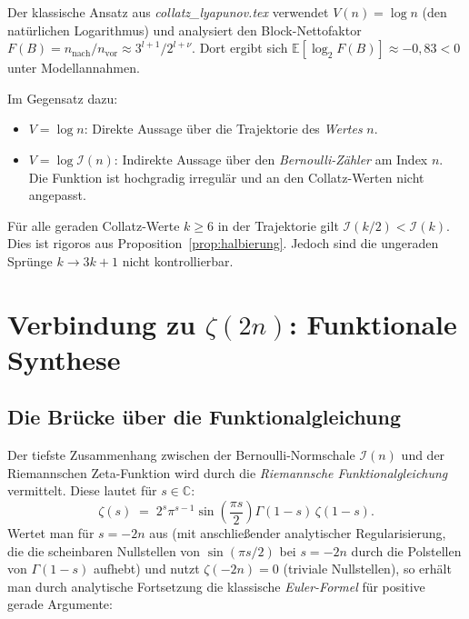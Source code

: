\documentclass[12pt,a4paper]{article}
\newcommand{\C}{\mathbb{C}}
\newcommand{\E}{\mathbb{E}}
\newcommand{\logt}{\log_2}
\newcommand{\In}{\mathcal{I}}      %
\begin{document}
Der klassische Ansatz aus \textit{collatz\_lyapunov.tex} verwendet
$V(n) = \log n$ (den natürlichen Logarithmus) und analysiert den Block-Nettofaktor
$F(B) = n_{\text{nach}} / n_{\text{vor}} \approx 3^{l+1}/2^{l+\nu}$. Dort ergibt sich
$\E[\logt F(B)] \approx -0{,}83 < 0$ unter Modellannahmen.

Im Gegensatz dazu:
\begin{itemize}[noitemsep]
  \item $V = \log n$: Direkte Aussage über die Trajektorie des \emph{Wertes} $n$.
  \item $V = \log\In(n)$: Indirekte Aussage über den \emph{Bernoulli-Zähler} am Index $n$.
    Die Funktion ist hochgradig irregulär und an den Collatz-Werten nicht angepasst.
\end{itemize}

\begin{tcolorbox}[ergebnis, title={Bewiesenes Ergebnis: Gerade Schritte}]
Für alle geraden Collatz-Werte $k \geq 6$ in der Trajektorie gilt
$\In(k/2) < \In(k)$. Dies ist rigoros aus Proposition~\ref{prop:halbierung}.
Jedoch sind die ungeraden Sprünge $k \to 3k+1$ nicht kontrollierbar.
\end{tcolorbox}

\section{Verbindung zu \texorpdfstring{$\zeta(2n)$}{zeta(2n)}: Funktionale Synthese}
\label{sec:riemann}

\subsection{Die Brücke über die Funktionalgleichung}
\label{subsec:funktionalgleichung}

Der tiefste Zusammenhang zwischen der Bernoulli-Normschale $\In(n)$ und der
Riemannschen Zeta-Funktion wird durch die \emph{Riemannsche Funktionalgleichung}
vermittelt. Diese lautet für $s \in \C$:
\[
  \zeta(s) \;=\; 2^s \pi^{s-1} \sin\!\left(\frac{\pi s}{2}\right) \Gamma(1-s)\,\zeta(1-s).
\]
Wertet man für $s = -2n$ aus (mit anschließender analytischer Regularisierung, die
die scheinbaren Nullstellen von $\sin(\pi s/2)$ bei $s = -2n$ durch die Polstellen
von $\Gamma(1-s)$ aufhebt) und nutzt $\zeta(-2n) = 0$ (triviale Nullstellen), so
erhält man durch analytische Fortsetzung die klassische \emph{Euler-Formel} für
positive gerade Argumente:
\end{document}
